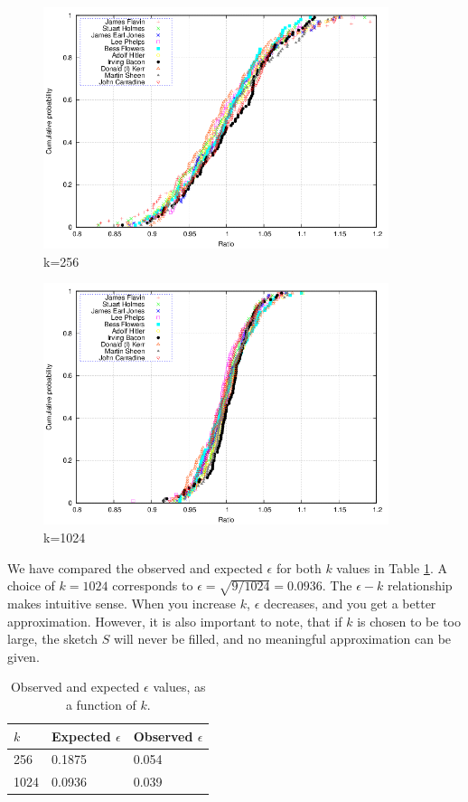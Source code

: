 \documentclass[a4paper,11pt]{article}
\begin{document}
\begin{figure}[H]
\centering \includegraphics[width=0.9\textwidth]{plot256.png}
\caption{k=256}\label{fig:k256}
\label{fig:exp256}
\end{figure}
\begin{figure}[H]
\centering \includegraphics[width=0.9\textwidth]{plot1024.png}
\caption{k=1024}\label{fig:k1024}
\label{fig:exp1024}
\end{figure}

We have compared the observed and expected $\epsilon$ for both $k$ values in Table \ref{tab:epsilon}. 
A choice of $k=1024$ corresponds to $\epsilon=\sqrt{9/1024}=0.0936$. The $\epsilon - k$ relationship makes intuitive sense. When you increase $k$, $\epsilon$ decreases, and you get a better approximation. However, it is also important to note, that if $k$ is chosen to be too large, the sketch $S$ will never be filled, and no meaningful approximation can be given.

\begin{table}[H]
    \begin{center}
    \begin{tabular}{l|l|l}
    $k$    & Expected $\epsilon$      & Observed $\epsilon$ \\ \hline
    256  & 0.1875 & 0.054      \\ \hline
    1024 & 0.0936 & 0.039      \\
    \end{tabular}
    \end{center}
\caption{Observed and expected $\epsilon$ values, as a function of $k$.}\label{tab:epsilon}
\end{table}
\end{document}
